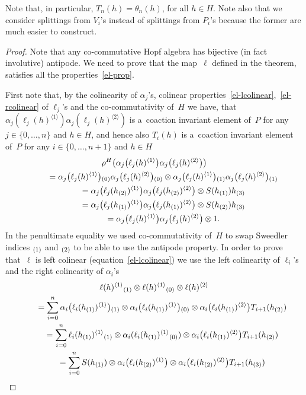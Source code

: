\documentclass[pdftex]{sigma}
\def\sw#1{{\sb{(#1)}}}
\newcommand{\ls}[1]{\ell(#1)^{\langle 1\rangle}}
\newcommand{\rs}[1]{\ell(#1)^{\langle 2\rangle}}
\newcommand{\lls}[2]{\ell_{#1}(#2)^{\langle 1\rangle}}
\newcommand{\rrs}[2]{\ell_{#1}(#2)^{\langle 2\rangle}}
\begin{document}
Note that, in particular, $T_n(h)=\theta_n(h)$, for all $h\in H$.
Note also that we consider splittings from $V_i$'s instead of splittings from $P_i$'s because the former are much easier
to construct.
\begin{proof}
Note that any co-commutative Hopf algebra has bijective (in fact involutive) antipode.
We need to prove that the map~$\ell$ def\/ined in the theorem, satisf\/ies all the properties~\eqref{el-prop}.

First note that, by the colinearity of $\alpha_j$'s, colinear properties~\eqref{el-lcolinear},~\eqref{el-rcolinear} of
$\ell_j$'s and the co-commutativity of~$H$ we have, that $\alpha_j(\lls{j}{h})\alpha_{j}(\rrs{j}{h})$ is a~coaction
invariant element of~$P$ for any $j\in\{0,\ldots,n\}$ and $h\in H$, and hence also $T_i(h)$ is a~coaction invariant
element of~$P$ for any $i\in\{0,\ldots,n+1\}$ and $h\in H$
\begin{gather*}
\rho^H\big(\alpha_j\big(\lls{j}{h}\big)\alpha_{j}\big(\rrs{j}{h}\big)\big)\\
\qquad{}
=\alpha_j\big(\lls{j}{h}\big)\sw{0}\alpha_{j}\big(\rrs{j}{h}\big)\sw{0} \otimes
\alpha_j\big(\lls{j}{h}\big)\sw{1}\alpha_{j}\big(\rrs{j}{h}\big)\sw{1}
\\
\qquad{}
 =\alpha_j\big(\lls{j}{h\sw{2}}\big)\alpha_{j}\big(\rrs{j}{h\sw{2}}\big)\otimes S(h\sw{1})h\sw{3}
\\
\qquad{}
 =\alpha_j\big(\lls{j}{h\sw{1}}\big)\alpha_{j}\big(\rrs{j}{h\sw{1}}\big)\otimes S(h\sw{2})h\sw{3}\\
 \qquad{}
 =\alpha_j\big(\lls{j}{h}\big)\alpha_{j}\big(\rrs{j}{h}\big)\otimes1.
\end{gather*}
In the penultimate equality we used co-commutativity of~$H$ to swap Sweedler indices $\sw{1}$ and $\sw{2}$ to be able to
use the antipode property.
In order to prove that~$\ell$ is left colinear (equation~\eqref{el-lcolinear}) we use the left colinearity of $\ell_i$'s
and the right colinearity of $\alpha_i$'s
\begin{gather*}
\ls{h}\sw{1}\otimes\ls{h}\sw{0}\otimes\rs{h}
\\
\qquad=
\sum\limits_{i=0}^n\alpha_i\big(\lls{i}{h\sw{1}}\big)\sw{1}\otimes\alpha_i\big(\lls{i}{h\sw{1}}\big)\sw{0}
\otimes\alpha_i\big(\rrs{i}{h\sw{1}}\big)T_{i+1}(h\sw{2})
\\
\qquad=
\sum\limits_{i=0}^n\lls{i}{h\sw{1}}\sw{1}\otimes\alpha_i(\lls{i}{h\sw{1}}\sw{0})
\otimes\alpha_i\big(\rrs{i}{h\sw{1}}\big)T_{i+1}(h\sw{2})
\\
\qquad=
\sum\limits_{i=0}^nS(h\sw{1})\otimes\alpha_i\big(\lls{i}{h\sw{2}}\big) \otimes\alpha_i\big(\rrs{i}{h\sw{2}}\big)T_{i+1}(h\sw{3})

\end{gather*}
\end{proof}
\end{document}
